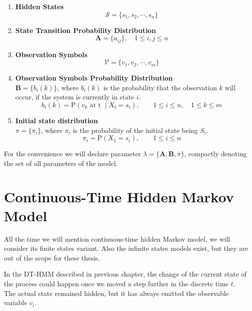 \documentclass[thesis=M,english]{FITthesis}[2012/10/20]
\newcommand{\matr}[1]{\mathbf{#1}}
\begin{document}
\begin{enumerate}[resume]
\setcounter{enumi}{0}
\item \textbf{Hidden States}
\begin{equation}
\mathcal{S} = \{ s_1,s_2, \cdots, s_n \}
\end{equation} 
\item \textbf{State Transition Probability Distribution}
\begin{equation}\label{eq:tp}
\matr{A} = \{ a_{ij} \}, \quad 1 \leq i,j \leq n
\end{equation} 
\item \textbf{Observation Symbols}
\begin{equation}
\mathcal{V} = \{ v_1,v_2, \cdots, v_m \} 
\end{equation}
\item \textbf{Observation Symbols Probability Distribution} \\
$\matr{B} = \{ b_{i}(k) \}$, where $b_{i}(k)$ is the probability that the observation $k$ will occur, if the system is currently in state $i$. 
\begin{equation}
b_i(k) = \mathrm{P}(v_k \text{ at t } \mid X_t = s_i), \qquad 1 \leq i \leq n, \quad 1 \leq k \leq m
\end{equation}
\item \textbf{Initial state distribution} \\
$\pi = \{ \pi_i \}$, where $\pi_i$ is the probability of the initial state being $S_i$.
\begin{equation}
\pi_{i} = \mathrm{P}(X_1 = s_i), \qquad 1 \leq i \leq n
\end{equation}
\end{enumerate}

For the convenience we will declare parameter $\lambda = \{\matr{A},\matr{B},\pi\}$, compactly denoting the set of all parameters of the model. 

\section{Continuous-Time Hidden Markov Model}

All the time we will mention continuous-time hidden Markov model, we will consider its finite states variant. Also the infinite states models exist, but they are out of the scope for these thesis.

In the DT-HMM described in previous chapter, the change of the current state of the process could happen once we moved a step further in the discrete time $t$. The actual state remained hidden, but it has always emitted the observable variable $v_i$.
\end{document}
